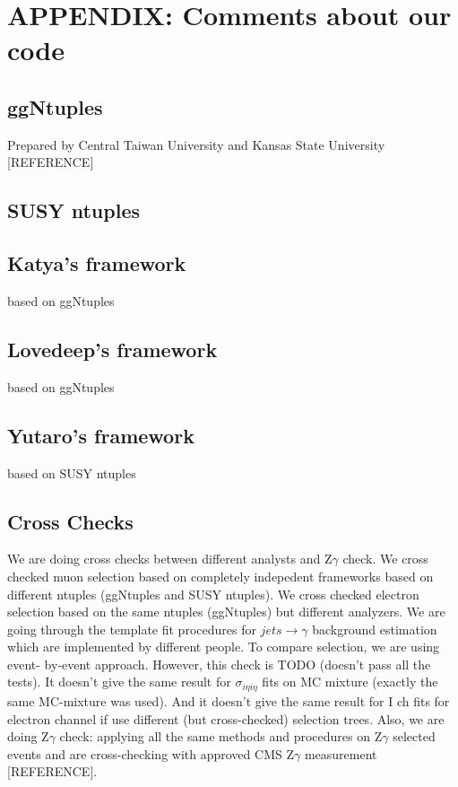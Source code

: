 \section{APPENDIX: Comments about our code}
\label{sec:Code}
\subsection{ggNtuples} 
Prepared by Central Taiwan University and Kansas State University [REFERENCE]
\subsection{SUSY ntuples} 
\subsection{Katya's framework}
based on ggNtuples
\subsection{Lovedeep's framework}
based on ggNtuples
\subsection{Yutaro's framework}
based on SUSY ntuples
\subsection{Cross Checks}
We are doing cross checks between different analysts and Z$\gamma$ check. We cross checked muon
selection based on completely indepedent frameworks based on different ntuples (ggNtuples and
SUSY ntuples). We cross checked electron selection based on the same ntuples (ggNtuples) but
different analyzers. We are going through the template fit procedures for $jets \rightarrow \gamma$ background
estimation which are implemented by different people. To compare selection, we are using event-
by-event approach. However, this check is TODO (doesn’t pass all the tests). It doesn’t give
the same result for $\sigma_{i \eta i \eta}$ fits on MC mixture (exactly the same MC-mixture was used). And it
doesn’t give the same result for I ch fits for electron channel if use different (but cross-checked)
selection trees. Also, we are doing Z$\gamma$ check: applying all the same methods and procedures on
Z$\gamma$ selected events and are cross-checking with approved CMS Z$\gamma$ measurement [REFERENCE].
